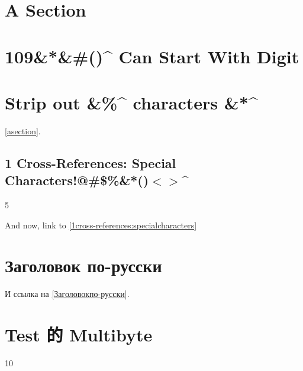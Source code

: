 \part{A Section }
\label{asection}

\part{109\&*\&\#()\^{} Can Start With Digit }
\label{109canstartwithdigit}

\part{Strip out \&\%\^{} characters \&*\^{} }
\label{stripoutcharacters}

\autoref{asection}.

\chapter{1 Cross-References: Special Characters!@\#\$\%\&*()$<$$>$\^{} }
\label{1cross-references:specialcharacters}

5

And now, link to \autoref{1cross-references:specialcharacters}

\part{Заголовок по-русски }
\label{Заголовокпо-русски}

И ссылка на \autoref{Заголовокпо-русски}.

\part{Test 的 Multibyte }
\label{test的multibyte}

10
